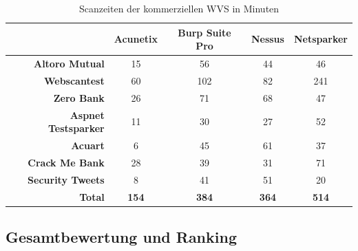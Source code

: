 \documentclass[12pt,oneside,a4paper,parskip,pointlessnumbers]{scrbook}
\begin{document}
\begin{table}[H]
\begin{tabular}{|r|c|c|c|c|}
\hline
                            & \textbf{Acunetix} & \textbf{Burp Suite Pro} & \textbf{Nessus} & \textbf{Netsparker}  \\
\hline
\textbf{Altoro Mutual}      & 15                & 56                      & 44              & 46                   \\
\hline
\textbf{Webscantest}        & 60                & 102                     & 82              & 241                  \\
\hline
\textbf{Zero Bank}          & 26                & 71                      & 68              & 47                   \\
\hline
\textbf{Aspnet Testsparker} & 11                & 30                      & 27              & 52                   \\
\hline
\textbf{Acuart}             & 6                 & 45                      & 61              & 37                   \\
\hline
\textbf{Crack Me Bank}      & 28                & 39                      & 31              & 71                   \\
\hline
\textbf{Security Tweets}    & 8                 & 41                      & 51              & 20                   \\
\hline
\textbf{Total}              & \textbf{154}      & \textbf{384}            & \textbf{364}    & \textbf{514}         \\
\hline
\end{tabular}
\caption[Scanzeiten der kommerziellen WVS in Minuten]{Scanzeiten der kommerziellen WVS in Minuten}
\end{table}


     \newpage
     \subsection{Gesamtbewertung und Ranking}
\end{document}
